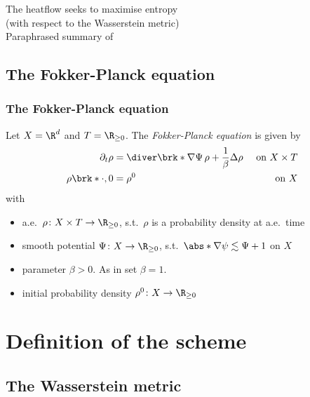 \begin{frame}[plain]
	\begin{center}
		\Large{{The heatflow seeks to maximise entropy \\ (with respect to the Wasserstein metric)}} \\
    \vspace{1em}
    \hfill \footnotesize{{Paraphrased summary of \autocite{Otto1998}}}
	\end{center}
\end{frame}



\subsection{The Fokker-Planck equation}
\begin{frame}
  \frametitle{The Fokker-Planck equation}
  Let $X=\R^d$ and $T=\R_{\geq0}$.
  The \emph{Fokker-Planck equation} is given by
  \begin{align*}
    \partial_t\rho&=\diver\brk*{\nabla\Psi\,\rho}+\frac{1}{\beta}\Delta\rho &\text{ on }X\times T\\
    \rho\brk*{\cdot,0}&=\rho^0 &\text{ on }X
  \end{align*}
  with
  \begin{itemize}
    \item a.e.\ $\rho\colon X\times T\to\R_{\geq0}$, s.t.\ $\rho$ is a probability density at a.e.\ time
    \item smooth potential $\Psi\colon X\to\R_{\geq0}$, s.t.\
      $\abs*{\nabla\psi}\lesssim\Psi+1$ on $X$
    \item parameter $\beta>0$. As in \autocite{Otto1998} set $\beta=1$.
    \item initial probability density $\rho^0\colon X\to\R_{\geq0}$
  \end{itemize}
\end{frame}

\section{Definition of the scheme}
\subsection{The Wasserstein metric}
